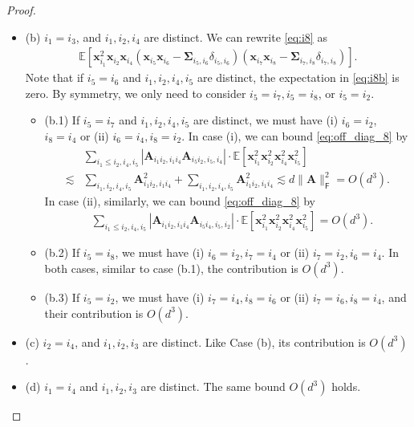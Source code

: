\documentclass[10pt,a4paper]{amsart}
\newcommand{\E}{\mathbb{E}}
\def\bA{{\boldsymbol A}}
\def\bSigma{{\boldsymbol \Sigma}}
\def\bx{{\boldsymbol x}}
\def\msf{\mathsf}
\begin{document}
\begin{proof}
\begin{enumerate}
\begin{itemize}
        \item (b) $i_1=i_3$, and $i_1,i_2,i_4$ are distinct. We can rewrite \eqref{eq:i8} as 
        \begin{align}\label{eq:i8b}
            \E[\bx_{i_1}^2\bx_{i_2}\bx_{i_4}(\bx_{i_5}\bx_{i_6}-\bSigma_{i_5,i_6}\delta_{i_5,i_6})(\bx_{i_7}\bx_{i_8}-\bSigma_{i_7,i_8}\delta_{i_7,i_8})].
        \end{align}
   Note that if $i_5=i_6$ and $i_1,i_2,i_4,i_5$ are distinct, the expectation in \eqref{eq:i8b} is zero. By symmetry, we only need to consider $i_5=i_7, i_5=i_8$, or $i_5=i_2$.
     \begin{itemize}
         \item  (b.1) If $i_5=i_7$ and $i_1,i_2,i_4,i_5$ are distinct, we must have (i) $i_6=i_2$, $i_8=i_4$ or (ii) $i_6=i_4, i_8=i_2$. In case (i), we can bound \eqref{eq:off_diag_8} by 
        \begin{align}
            &\sum_{i_1\leq i_2, i_4, i_5} |\bA_{i_1i_2,i_1i_4}\bA_{i_5i_2, i_5,i_4}|\cdot \E[\bx_{i_1}^2\bx_{i_2}^2\bx_{i_4}^2\bx_{i_5}^2]\\
            \lesssim  &\sum_{i_1,i_2,i_4,i_5}\bA_{i_1i_2,i_1i_4}^2 +\sum_{i_1,i_2,i_4,i_5}\bA_{i_1i_2,i_1i_4}^2\lesssim d\|\bA\|_{\msf F}^2=O(d^3).
        \end{align}
        In case (ii), similarly, we can bound \eqref{eq:off_diag_8} by 
        \begin{align}
            &\sum_{i_1\leq i_2, i_4, i_5} |\bA_{i_1i_2,i_1i_4}\bA_{i_5i_4, i_5,i_2}|\cdot \E[\bx_{i_1}^2\bx_{i_2}^2\bx_{i_4}^2\bx_{i_5}^2]=O(d^3).
        \end{align}
        \item (b.2) If $i_5=i_8$, we must have (i) $i_6=i_2, i_7=i_4$ or (ii) $i_7=i_2, i_6=i_4$. In both cases, similar to case (b.1), the contribution is $O(d^3)$. 
        \item (b.3) If $i_5=i_2$, we must have (i) $i_7=i_4,i_8=i_6$ or (ii) $i_7=i_6, i_8=i_4$, and their contribution is $O(d^3)$.
     \end{itemize}
    
      
        
        \item (c) $i_2=i_4$, and $i_1,i_2,i_3$ are distinct. Like Case (b), its contribution is $O(d^3)$.
    \item (d) $i_1=i_4$ and $i_1,i_2,i_3$ are distinct. The same bound $O(d^3)$ holds.
    \end{itemize}
    



\end{enumerate}
\end{proof}
\end{document}
